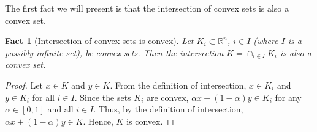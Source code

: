 \documentclass[smallextended,numbook,nospthms]{svjour3}
\theoremstyle{plain}
\newtheorem{fact}[theorem]{Fact}
\theoremstyle{definition}
\def\RR{\mathds R}
\begin{document}
The first fact we will present is that the intersection of convex sets is also a convex set.

\begin{fact}[Intersection of convex sets is convex]\label{fact:cap convex}
Let $K_i \subset \RR^n$, $i \in I$ (where $I$ is a possibly infinite set), be convex sets. Then the intersection $K=\cap_{i \in I}K_i$ is also a convex set.
\end{fact}	
\begin{proof}
	Let $x \in K$ and $y \in K$. From the definition of intersection, $x \in K_i$ and $y \in K_i$ for all $i \in I$. Since the sets $K_i$ are convex, $\alpha x + (1-\alpha)y \in K_i$ for any $\alpha \in [0,1]$ and all $i \in I$. Thus, by the definition of intersection, $\alpha x + (1-\alpha)y \in K$. Hence, $K$ is convex.
\end{proof}
\end{document}
